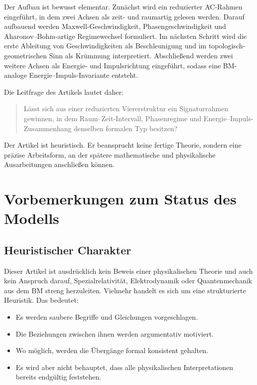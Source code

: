 \documentclass[11pt,a4paper]{article}
\theoremstyle{definition}
\theoremstyle{plain}
\begin{document}
	Der Aufbau ist bewusst elementar. Zunächst wird ein reduzierter AC-Rahmen eingeführt, in dem zwei Achsen als zeit- und raumartig gelesen werden. Darauf aufbauend werden Maxwell-Geschwindigkeit, Phasengeschwindigkeit und Aharonov--Bohm-artige Regimewechsel formuliert. Im nächsten Schritt wird die erste Ableitung von Geschwindigkeiten als Beschleunigung und im topologisch-geometrischen Sinn als Krümmung interpretiert. Abschließend werden zwei weitere Achsen als Energie- und Impulsrichtung eingeführt, sodass eine BM-analoge Energie--Impuls-Invariante entsteht.
	
	Die Leitfrage des Artikels lautet daher:
	\begin{quote}
		Lässt sich aus einer reduzierten Viererstruktur ein Signaturrahmen gewinnen, in dem Raum--Zeit-Intervall, Phasenregime und Energie--Impuls-Zusammenhang denselben formalen Typ besitzen?
	\end{quote}
	
	Der Artikel ist heuristisch. Er beansprucht keine fertige Theorie, sondern eine präzise Arbeitsform, an der spätere mathematische und physikalische Ausarbeitungen anschließen können.
	
	\section{Vorbemerkungen zum Status des Modells}
	
	\subsection{Heuristischer Charakter}
	
	Dieser Artikel ist ausdrücklich kein Beweis einer physikalischen Theorie und auch kein Anspruch darauf, Spezialrelativität, Elektrodynamik oder Quantenmechanik aus dem BM streng herzuleiten. Vielmehr handelt es sich um eine strukturierte Heuristik. Das bedeutet:
	\begin{itemize}[leftmargin=2em]
		\item Es werden saubere Begriffe und Gleichungen vorgeschlagen.
		\item Die Beziehungen zwischen ihnen werden argumentativ motiviert.
		\item Wo möglich, werden die Übergänge formal konsistent gehalten.
		\item Es wird aber nicht behauptet, dass alle physikalischen Interpretationen bereits endgültig feststehen.
	\end{itemize}
	
\end{document}
